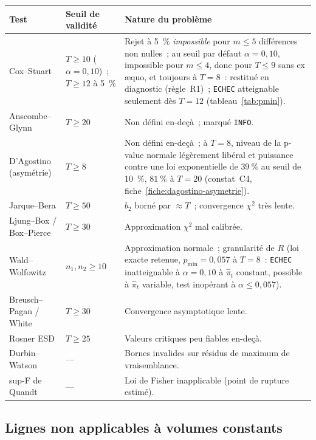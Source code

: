 \documentclass[a4paper,11pt]{article}
\newcommand{\code}[1]{\texttt{\small #1}}
\begin{document}
\begin{center}
\small
\begin{tabular}{@{}p{4.4cm}p{2.6cm}p{8.0cm}@{}}
\toprule
\textbf{Test} & \textbf{Seuil de validité} & \textbf{Nature du problème} \\
\midrule
Cox--Stuart & $T \ge 10$ ($\alpha = 0{,}10$)~; $T \ge 12$ à 5~\% & Rejet à 5~\% \emph{impossible}
pour $m \le 5$ différences non nulles~; au seuil par défaut $\alpha = 0{,}10$, impossible pour
$m \le 4$, donc pour $T \le 9$ sans ex \ae quo, et toujours à $T = 8$~: restitué en diagnostic
(règle~R1)~; \code{ECHEC} atteignable seulement dès $T = 12$ (tableau~\ref{tab:pmin}). \\
Anscombe--Glynn & $T \ge 20$ & Non défini en-deçà~; marqué \code{INFO}. \\
D'Agostino (asymétrie) & $T \ge 8$ & Non défini en-deçà~; à $T = 8$, niveau de la p-value normale légèrement libéral et puissance contre une loi exponentielle de $39~\%$ au seuil de 10~\%, $81~\%$ à $T = 20$ (constat~C4, fiche~\ref{fiche:dagostino-asymetrie}). \\
Jarque--Bera & $T \ge 50$ & $b_2$ borné par $\approx T$~; convergence $\chi^2$ très lente. \\
Ljung--Box / Box--Pierce & $T \ge 30$ & Approximation $\chi^2$ mal calibrée. \\
Wald--Wolfowitz & $n_1,n_2 \ge 10$ & Approximation normale~; granularité de $R$ (loi exacte
retenue, $p_{\min} = 0{,}057$ à $T = 8$~: \code{ECHEC} inatteignable à $\alpha = 0{,}10$ à
$\hat\pi_t$ constant, possible à $\hat\pi_t$ variable, test inopérant à $\alpha \le 0{,}057$). \\
Breusch--Pagan / White & $T \ge 30$ & Convergence asymptotique lente. \\
Rosner ESD & $T \ge 25$ & Valeurs critiques peu fiables en-deçà. \\
Durbin--Watson & --- & Bornes invalides sur résidus de maximum de vraisemblance. \\
sup-F de Quandt & --- & Loi de Fisher inapplicable (point de rupture estimé). \\
\bottomrule
\end{tabular}
\end{center}

\subsection*{Lignes non applicables à volumes constants}
\label{sec:volumes-constants}
\end{document}
